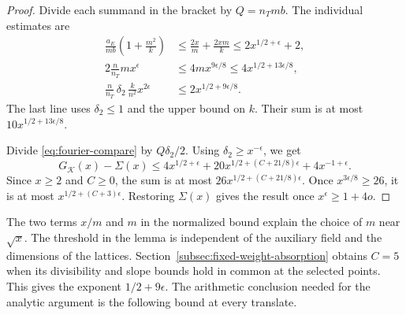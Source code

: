 \begin{proof}
Divide each summand in the bracket by \(Q=n_Tmb\). The
individual estimates are
\[
 \begin{aligned}
 \frac{a_E}{mb}\left(1+\frac{m^2}{k}\right)
    &\le\frac{2x}{m}+\frac{2xm}{k}
      \le 2x^{1/2+\epsilon}+2,\\
 2\frac{n}{n_T}m x^\epsilon
    &\le 4m x^{9\epsilon/8}\le4x^{1/2+13\epsilon/8},\\
 \frac{n}{n_T}\,\delta_2\,\frac{k}{n^2}x^{2\epsilon}
    &\le 2x^{1/2+9\epsilon/8}.
 \end{aligned}
\]
The last line uses \(\delta_2\le1\) and the upper bound on \(k\).
Their sum is at most \(10x^{1/2+13\epsilon/8}\).

Divide \eqref{eq:fourier-compare} by \(Q\delta_2/2\).
Using \(\delta_2\ge x^{-\epsilon}\), we get
\[
 G_{\mathcal K}(x)-\Sigma(x)
 \le 4x^{1/2+\epsilon}
     +20x^{1/2+(C+21/8)\epsilon}
     +4x^{-1+\epsilon}.
\]
Since \(x\ge2\) and \(C\ge0\), the sum is at most
\(26x^{1/2+(C+21/8)\epsilon}\). Once \(x^{3\epsilon/8}\ge26\),
it is at most \(x^{1/2+(C+3)\epsilon}\). Restoring \(\Sigma(x)\)
gives the result once \(x^\epsilon\ge1+4o\).
\end{proof}

The two terms \(x/m\) and \(m\) in the normalized bound explain the
choice of \(m\) near \(\sqrt{x}\). The threshold in the lemma
is independent of the auxiliary field and the dimensions of the lattices.
Section~\ref{subsec:fixed-weight-absorption} obtains \(C=5\) when its divisibility and slope bounds hold in common at the selected points. This gives the exponent \(1/2+9\epsilon\).
The arithmetic conclusion needed for the analytic argument is the following bound at every translate.

